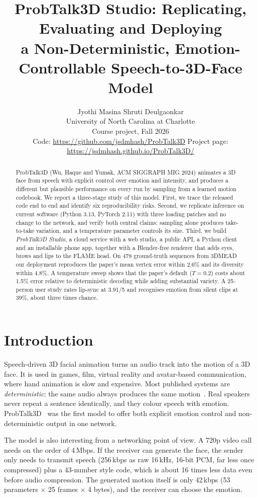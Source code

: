 \documentclass[10pt,twocolumn,letterpaper]{article}
\title{\textbf{ProbTalk3D Studio: Replicating, Evaluating and Deploying\\a Non-Deterministic, Emotion-Controllable Speech-to-3D-Face Model}}
\author{Jyothi Masina \qquad Shruti Deulgaonkar\\[2pt]
\small University of North Carolina at Charlotte\\
\small Course project, Fall 2026\\[2pt]
\small Code: \url{https://github.com/jsdmhash/ProbTalk3D} \quad Project page: \url{https://jsdmhash.github.io/ProbTalk3D/}}
\date{}
\begin{document}
\maketitle

\begin{abstract}
ProbTalk3D (Wu, Haque and Yumak, ACM SIGGRAPH MIG 2024) animates a 3D face from speech with explicit control over emotion and intensity, and produces a different but plausible performance on every run by sampling from a learned motion codebook. We report a three-stage study of this model. First, we trace the released code end to end and identify six reproducibility risks. Second, we replicate inference on current software (Python 3.13, PyTorch 2.11) with three loading patches and no change to the network, and verify both central claims: sampling alone produces take-to-take variation, and a temperature parameter controls its size. Third, we build \emph{ProbTalk3D Studio}, a cloud service with a web studio, a public API, a Python client and an installable phone app, together with a Blender-free renderer that adds eyes, brows and lips to the FLAME head. On 478 ground-truth sequences from 3DMEAD our deployment reproduces the paper's mean vertex error within 2.6\% and its diversity within 4.8\%. A temperature sweep shows that the paper's default ($T{=}0.2$) costs about 1.5\% error relative to deterministic decoding while adding substantial variety. A 25-person user study rates lip-sync at 3.91/5 and recognises emotion from silent clips at 39\%, about three times chance.
\end{abstract}

\section{Introduction}
Speech-driven 3D facial animation turns an audio track into the motion of a 3D face. It is used in games, film, virtual reality and avatar-based communication, where hand animation is slow and expensive. Most published systems are \emph{deterministic}: the same audio always produces the same motion~\cite{faceformer,codetalker}. Real speakers never repeat a sentence identically, and they colour speech with emotion. ProbTalk3D~\cite{probtalk3d} was the first model to offer both explicit emotion control and non-deterministic output in one network.

The model is also interesting from a networking point of view. A 720p video call needs on the order of 4\,Mbps. If the receiver can generate the face, the sender only needs to transmit speech (256\,kbps as raw 16\,kHz, 16-bit PCM, far less once compressed) plus a 43-number style code, which is about 16 times less data even before audio compression. The generated motion itself is only 42\,kbps (53 parameters $\times$ 25 frames $\times$ 4 bytes), and the receiver can choose the emotion.
\end{document}
